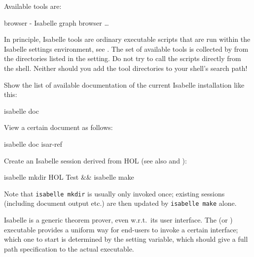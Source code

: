 \begin{isabellebody}
\begin{isamarkuptext}
\begin{ttbox}
  Available tools are:

    browser - Isabelle graph browser
    \dots
\end{ttbox}

  In principle, Isabelle tools are ordinary executable scripts that
  are run within the Isabelle settings environment, see
  .  The set of available tools is collected by
  \hyperlink{executable.isabelle}{\mbox{}} from the directories listed in the \hyperlink{setting.ISABELLE-TOOLS}{\mbox{}} setting.  Do not try to call the scripts directly
  from the shell.  Neither should you add the tool directories to your
  shell's search path!%
\end{isamarkuptext}%
\isamarkuptrue%
%
\isamarkuptrue%
%
\begin{isamarkuptext}%
Show the list of available documentation of the current Isabelle
  installation like this:

\begin{ttbox}
  isabelle doc
\end{ttbox}

  View a certain document as follows:
\begin{ttbox}
  isabelle doc isar-ref
\end{ttbox}

  Create an Isabelle session derived from HOL (see also
   and ):
\begin{ttbox}
  isabelle mkdir HOL Test && isabelle make
\end{ttbox}
  Note that \verb|isabelle mkdir| is usually only invoked once;
  existing sessions (including document output etc.) are then updated
  by \verb|isabelle make| alone.%
\end{isamarkuptext}%
\isamarkuptrue%
%
\isamarkuptrue%
%
\begin{isamarkuptext}%
Isabelle is a generic theorem prover, even w.r.t.\ its user
  interface.  The \hypertarget{executable.Isabelle}{\hyperlink{executable.Isabelle}{\mbox{}}} (or \hypertarget{executable.isabelle-interface}{\hyperlink{executable.isabelle-interface}{\mbox{}}}) executable provides a uniform way for
  end-users to invoke a certain interface; which one to start is
  determined by the \hyperlink{setting.ISABELLE-INTERFACE}{\mbox{}} setting
  variable, which should give a full path specification to the actual
  executable.


\end{isamarkuptext}
\end{isabellebody}
